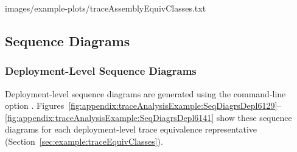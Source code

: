 \setTextListing
%
{images/example-plots/traceAssemblyEquivClasses.txt}

\pagebreak

\subsection{Sequence Diagrams}\label{sec:example:seqDiagrams}%

\subsubsection{Deployment-Level Sequence Diagrams}\label{sec:example:deploymentSeqDiagrams}%

Deployment-level sequence diagrams are generated using the command-line option \OPT{\OPTplotDeploymentSequenceDiagrams}. %
Figures~\ref{fig:appendix:traceAnalysisExample:SeqDiagrsDepl6129}--\ref{fig:appendix:traceAnalysisExample:SeqDiagrsDepl6141} %
show these sequence diagrams for each deployment-level %
trace equivalence representative (Section~\ref{sec:example:traceEquivClasses}).


